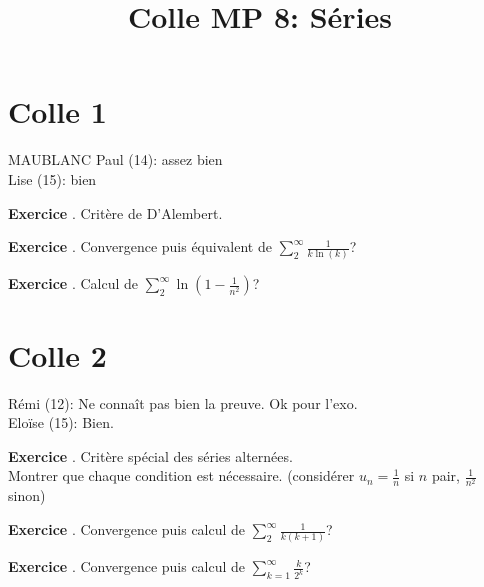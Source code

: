 \documentclass[10pt,a4paper]{article}
\title{Colle MP 8: Séries}
\newcounter{question}
\newcounter{exo}
\newenvironment{exo}{\vspace{0.5cm}\setcounter{question}{0}\addtocounter{exo}{1} \noindent \textbf{Exercice \theexo}. \normalsize }{\par}
\begin{document}
	\maketitle
	
	\section*{Colle 1}
	MAUBLANC Paul (14): assez bien\\
	Lise (15): bien\\
	
	\begin{exo}
		Critère de D'Alembert.
	\end{exo}
	
	\begin{exo}
		Convergence puis équivalent de $\sum_{2}^{\infty} \frac{1}{k\ln(k)}$? 
	\end{exo}

	\begin{exo}
		Calcul de $\sum_{2}^{\infty} \ln(1 - \frac{1}{n^2})$? 
	\end{exo}
	
	\section*{Colle 2}
	\setcounter{exo}{0}
	Rémi (12): Ne connaît pas bien la preuve. Ok pour l'exo.\\
	Eloïse (15): Bien. \\
 	
	\begin{exo}
		Critère spécial des séries alternées.\\
		Montrer que chaque condition est nécessaire. (considérer $u_n = \frac{1}{n}$ si $n$ pair, $\frac{1}{n^2}$ sinon)
	\end{exo}

	\begin{exo}
		Convergence puis calcul de $\sum_{2}^{\infty} \frac{1}{k(k+1)}$? 
	\end{exo}
	
	\begin{exo}
		Convergence puis calcul de $\sum_{k=1}^{\infty} \frac{k}{2^k}$?
	\end{exo}
	
\end{document}
